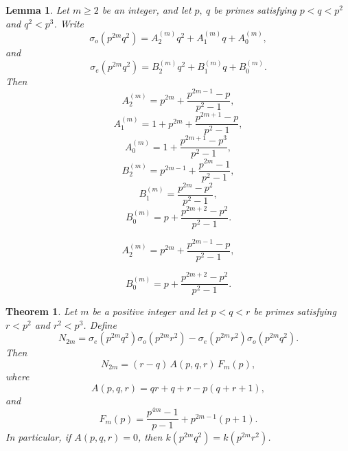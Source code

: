 \documentclass[10pt,a4paper]{amsart}
\newtheorem{theorem}{Theorem}
\newtheorem{lemma}{Lemma}
\begin{document}
\begin{lemma}\label{lem:closedcoeff}
Let \(m\ge2\) be an integer, and let \(p,\ q\) be primes satisfying $p<q<p^2$ and $q^2<p^3$.
Write
\[
\sigma_o(p^{2m}q^2)=A_2^{(m)}q^2+A_1^{(m)}q+A_0^{(m)},
\]
and
\[
\sigma_e(p^{2m}q^2)=B_2^{(m)}q^2+B_1^{(m)}q+B_0^{(m)}.
\]
Then
\begin{equation}\label{E8}
A_2^{(m)}
=
p^{2m}
+
\frac{p^{2m-1}-p}{p^2-1},
\end{equation}
\begin{equation}\label{E9}
A_1^{(m)}
=
1+p^{2m}
+
\frac{p^{2m+1}-p}{p^2-1},
\end{equation}
\begin{equation}\label{E10}
A_0^{(m)}
=
1+
\frac{p^{2m+1}-p^3}{p^2-1},
\end{equation}
\begin{equation}\label{E11}
B_2^{(m)}
=
p^{2m-1}
+
\frac{p^{2m}-1}{p^2-1},
\end{equation}
\begin{equation}\label{E12}
B_1^{(m)}
=
\frac{p^{2m}-p^2}{p^2-1},
\end{equation}
\begin{equation}\label{E13}
B_0^{(m)}
=
p+
\frac{p^{2m+2}-p^2}{p^2-1}.
\end{equation}
\end{lemma}

\begin{equation}
A_2^{(m)}
=
p^{2m}
+
\frac{p^{2m-1}-p}{p^2-1},
\end{equation}

\begin{equation}
B_0^{(m)}
=
p+
\frac{p^{2m+2}-p^2}{p^2-1}.
\end{equation}

\begin{theorem}\label{thm:factorization}
Let \(m\) be a positive integer and let \(p<q<r\) be primes satisfying $r<p^2$ and $r^2<p^3$.
Define
\[
N_{2m}
=
\sigma_e(p^{2m}q^2)\sigma_o(p^{2m}r^2)
-
\sigma_e(p^{2m}r^2)\sigma_o(p^{2m}q^2).
\]
Then
\[
N_{2m}
=
(r-q)\,
A(p,q,r)\,
F_m(p),
\]
where
\[
A(p,q,r)=qr+q+r-p(q+r+1),
\]
and
\[
F_m(p)
=
\frac{p^{4m}-1}{p-1}+p^{2m-1}(p+1).
\]
In particular, if $A(p,q,r)=0$, then $k(p^{2m}q^2)=k(p^{2m}r^2)$.
\end{theorem}
\end{document}
